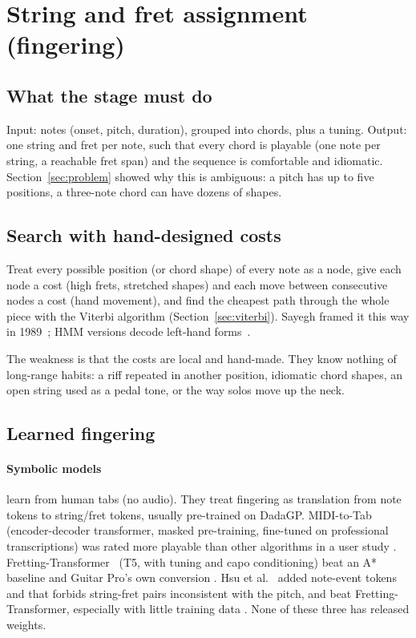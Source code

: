 \section{String and fret assignment (fingering)}
\label{sec:fingering}

\subsection{What the stage must do}

Input: notes (onset, pitch, duration), grouped into chords, plus a tuning.
Output: one string and fret per note, such that every chord is playable (one
note per string, a reachable fret span) and the sequence is comfortable and
idiomatic. Section~\ref{sec:problem} showed why this is ambiguous: a pitch has
up to five positions, a three-note chord can have dozens of shapes.

\subsection{Search with hand-designed costs}

\begin{keyidea}
Treat every possible position (or chord shape) of every note as a node, give
each node a cost (high frets, stretched shapes) and each move between
consecutive nodes a cost (hand movement), and find the cheapest path through
the whole piece with the Viterbi algorithm (Section~\ref{sec:viterbi}). Sayegh
framed it this way in 1989~\cite{sayegh1989fingering}; HMM versions decode
left-hand forms~\cite{hori2016minimax}.
\end{keyidea}

The weakness is that the costs are local and hand-made. They know nothing of
long-range habits: a riff repeated in another position, idiomatic chord shapes,
an open string used as a pedal tone, or the way solos move up the neck.

\subsection{Learned fingering}

\paragraph{Symbolic models} learn from human tabs (no audio). They treat
fingering as translation from note tokens to string/fret tokens, usually
pre-trained on DadaGP. MIDI-to-Tab~\cite{edwards2024miditotab} (encoder-decoder
transformer, masked pre-training, fine-tuned on professional transcriptions)
was rated more playable than other algorithms in a user study \reported.
Fretting-Transformer~\cite{hamberger2025fretting} (T5, with tuning and capo
conditioning) beat an A* baseline and Guitar Pro's own conversion \reported.
Hsu et al.~\cite{hsu2026noteevent} added note-event tokens and  that forbids string-fret pairs inconsistent with the pitch, and beat
Fretting-Transformer, especially with little training data \reported. None of
these three has released weights.

